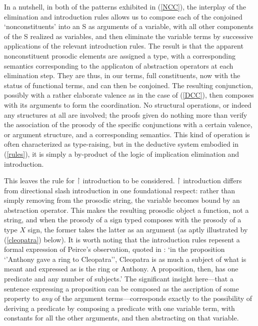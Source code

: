 \documentclass[output=paper,colorlinks,citecolor=brown]{langscibook}
\begin{document}
In a nutshell, in both of the patterns exhibited in (\ref{NCC}), the
interplay of the elimination and introduction rules allows us to
compose each of the conjoined `nonconstituents' into an S as arguments
of a variable, with all other components of the S realized as
variables, and then eliminate the variable terms by successive
applications of the relevant introduction rules. The result is that
the apparent nonconstituent prosodic elements are assigned a type,
with a corresponding semantics corresponding to the applicaton of
abstraction operators at each elimination step. They are thus, in our
terms, full constituents, now with the status of functional terms, and
can then be conjoined. The resulting conjunction, possibly with a
rather elaborate valence as in the case of (\ref{DCC}), then composes with
its arguments to form the coordination. No structural operations, or
indeed any structures at all are involved; the proofs given do
nothing more than verify the association of the prosody of the
specific conjunctions with a certain valence, or argument structure,
and a corresponding semantics. This kind of operation is often
characterized as type-raising, but in the deductive system embodied in
(\ref{rules}), it is simply a by-product of the logic of implication
elimination and introduction.

This leaves the rule for \ensuremath{\vs} introduction to be considered. \ensuremath{\vs}
introduction differs from directional slash introduction in one
foundational respect: rather than simply removing \pt{ \ensuremath{\greekp} } from the
prosodic string, the variable becomes bound by an abstraction
operator. This makes the resulting prosodic object a function, not a
string, and when the prosody of a sign typed  composes with
the prosody of a type $X$ sign, the former takes the latter as an
argument (as aptly illustrated by (\ref{cleopatra}) below).  It is worth
noting that the introduction rules repesent a formal expression of
Peirce's observation, quoted in \citet[8]{nothPeirce}: `in the proposition
{`'}Anthony gave a ring to Cleopatra'', Cleopatra is as much a subject of what is
meant and expressed as is the ring or Anthony. A proposition, then,
has one predicate and any number of subjects.' The significant insight
here---that a sentence expressing a proposition can be composed as the
ascription of some property to \textsl{any} of the argument
terms---corresponds exactly to the possibility of deriving a predicate
by composing a predicate with one variable term, with constants for
all the other arguments, and then abstracting on that
variable. 
\end{document}
